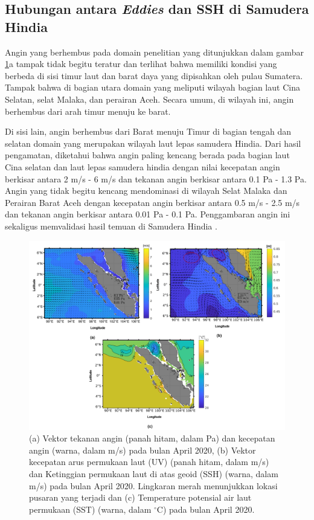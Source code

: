 \begin{spacing}{1.5}
\subsection[Hubungan antara \textit{Eddies} dan SSH di Samudera Hindia]{Hubungan antara \textit{Eddies} dan SSH di Samudera Hindia}
	
	Angin yang berhembus pada domain penelitian yang ditunjukkan dalam gambar \ref{fig:paper2_1}a tampak tidak begitu teratur dan terlihat bahwa memiliki kondisi yang berbeda di sisi timur laut dan barat daya yang dipisahkan oleh pulau Sumatera. Tampak bahwa di bagian utara domain yang meliputi wilayah bagian laut Cina Selatan, selat Malaka, dan perairan Aceh. Secara umum, di wilayah ini, angin berhembus dari arah timur menuju ke barat. 
	
	Di sisi lain, angin berhembus dari Barat menuju Timur di bagian tengah dan selatan domain yang merupakan wilayah laut lepas samudera Hindia. Dari hasil pengamatan, diketahui bahwa angin paling kencang berada pada bagian laut Cina selatan dan laut lepas samudera hindia dengan nilai kecepatan angin berkisar antara 2 m/s - 6 m/s dan tekanan angin berkisar antara 0.1 Pa - 1.3 Pa. Angin yang tidak begitu kencang mendominasi di wilayah Selat Malaka dan Perairan Barat Aceh dengan kecepatan angin berkisar antara 0.5 m/s - 2.5 m/s dan tekanan angin berkisar antara 0.01 Pa - 0.1 Pa. Penggambaran angin ini sekaligus memvalidasi hasil temuan di Samudera Hindia .
	
	\begin{figure}[H]
		\centering
		\includegraphics[width=15cm]{contents/final_figure_paper2/gambar_1}
		\caption{(a) Vektor tekanan angin (panah hitam, dalam Pa) dan kecepatan angin (warna, dalam m/s) pada bulan April 2020, (b) Vektor kecepatan arus permukaan laut (UV) (panah hitam, dalam m/s) dan Ketinggian permukaan laut di atas geoid (SSH) (warna, dalam m/s) pada bulan April 2020. Lingkaran merah menunjukkan lokasi pusaran yang terjadi dan (c) Temperature potensial air laut permukaan (SST) (warna, dalam $^\circ$C) pada bulan April 2020.}
		\label{fig:paper2_1}
	\end{figure}
	

\end{spacing}
